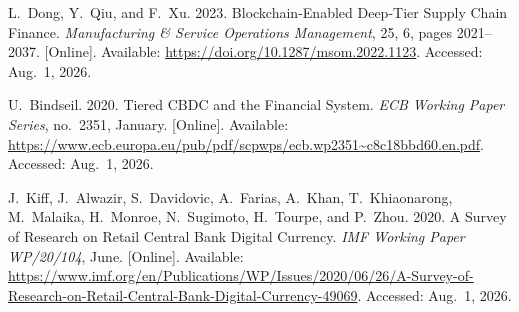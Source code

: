 \documentclass[12pt,a4paper]{report}
\begin{document}
{\begin{enumerate}[label={[\arabic*]}]
\item L.~Dong, Y.~Qiu, and F.~Xu. 2023. Blockchain-Enabled Deep-Tier Supply Chain Finance. \emph{Manufacturing \& Service Operations Management}, 25, 6, pages 2021--2037. [Online]. Available: \url{https://doi.org/10.1287/msom.2022.1123}. Accessed: Aug.~1, 2026.

\item U.~Bindseil. 2020. Tiered CBDC and the Financial System. \emph{ECB Working Paper Series}, no.~2351, January. [Online]. Available: \url{https://www.ecb.europa.eu/pub/pdf/scpwps/ecb.wp2351~c8c18bbd60.en.pdf}. Accessed: Aug.~1, 2026.

\item J.~Kiff, J.~Alwazir, S.~Davidovic, A.~Farias, A.~Khan, T.~Khiaonarong, M.~Malaika, H.~Monroe, N.~Sugimoto, H.~Tourpe, and P.~Zhou. 2020. A Survey of Research on Retail Central Bank Digital Currency. \emph{IMF Working Paper WP/20/104}, June. [Online]. Available: \url{https://www.imf.org/en/Publications/WP/Issues/2020/06/26/A-Survey-of-Research-on-Retail-Central-Bank-Digital-Currency-49069}. Accessed: Aug.~1, 2026.






\end{enumerate}}
\end{document}
